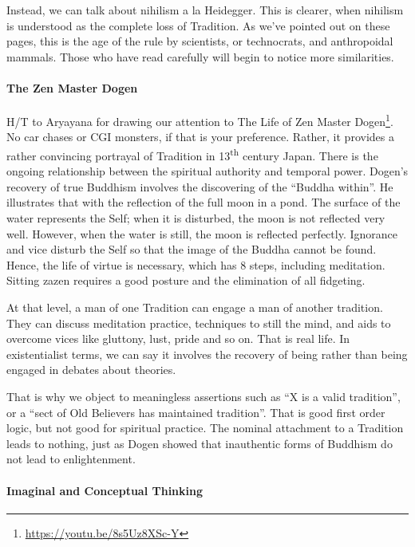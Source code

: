 Instead, we can talk about nihilism a la Heidegger. This is clearer, when nihilism is understood as the complete loss of Tradition. As we've pointed out on these pages, this is the age of the rule by scientists, or technocrats, and anthropoidal mammals. Those who have read carefully will begin to notice more similarities.

\paragraph{The Zen Master Dogen}


H/T to Aryayana for drawing our attention to The Life of Zen Master Dogen\footnote{\url{https://youtu.be/8s5Uz8XSc-Y}}. No car chases or CGI monsters, if that is your preference. Rather, it provides a rather convincing portrayal of Tradition in 13\textsuperscript{th} century Japan. There is the ongoing relationship between the spiritual authority and temporal power. Dogen's recovery of true Buddhism involves the discovering of the ``Buddha within''. He illustrates that with the reflection of the full moon in a pond. The surface of the water represents the Self; when it is disturbed, the moon is not reflected very well. However, when the water is still, the moon is reflected perfectly. Ignorance and vice disturb the Self so that the image of the Buddha cannot be found. Hence, the life of virtue is necessary, which has 8 steps, including meditation. Sitting zazen requires a good posture and the elimination of all fidgeting.

At that level, a man of one Tradition can engage a man of another tradition. They can discuss meditation practice, techniques to still the mind, and aids to overcome vices like gluttony, lust, pride and so on. That is real life. In existentialist terms, we can say it involves the recovery of being rather than being engaged in debates about theories.

That is why we object to meaningless assertions such as ``X is a valid tradition'', or a ``sect of Old Believers has maintained tradition''. That is good first order logic, but not good for spiritual practice. The nominal attachment to a Tradition leads to nothing, just as Dogen showed that inauthentic forms of Buddhism do not lead to enlightenment.

\paragraph{Imaginal and Conceptual Thinking}


